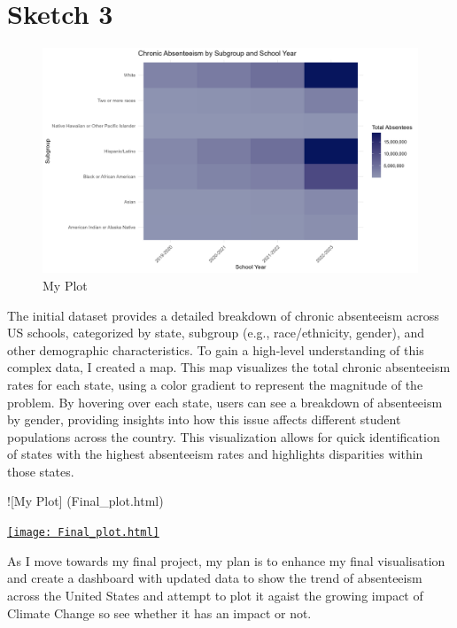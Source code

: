 \documentclass[
]{article}
\begin{document}
\section{Sketch 3}\label{sketch-3}

\begin{figure}
\centering
\includegraphics{Sketch 3.png}
\caption{My Plot}
\end{figure}

The initial dataset provides a detailed breakdown of chronic absenteeism
across US schools, categorized by state, subgroup (e.g., race/ethnicity,
gender), and other demographic characteristics. To gain a high-level
understanding of this complex data, I created a map. This map visualizes
the total chronic absenteeism rates for each state, using a color
gradient to represent the magnitude of the problem. By hovering over
each state, users can see a breakdown of absenteeism by gender,
providing insights into how this issue affects different student
populations across the country. This visualization allows for quick
identification of states with the highest absenteeism rates and
highlights disparities within those states.

!{[}My Plot{]} (Final\_plot.html)

\href{file:///E:/RStudio/ProjectProposal/Final_plot.html}{\texttt{[image: Final\_plot.html]}}

As I move towards my final project, my plan is to enhance my final
visualisation and create a dashboard with updated data to show the trend
of absenteeism across the United States and attempt to plot it agaist
the growing impact of Climate Change so see whether it has an impact or
not.
\end{document}
